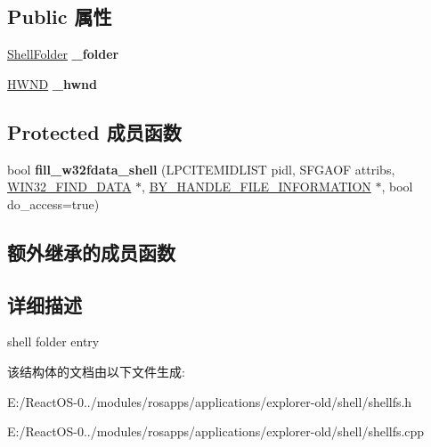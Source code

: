 \subsection*{Public 属性}
\begin{DoxyCompactItemize}
\item 
\mbox{\label{struct_shell_directory_a9a35d0d2f90518ef13601fdfb1262e30}} 
\hyperlink{struct_shell_folder}{Shell\+Folder} {\bfseries \+\_\+folder}
\item 
\mbox{\label{struct_shell_directory_ac7a5b7139055110bebf662a586e1b84f}} 
\hyperlink{interfacevoid}{H\+W\+ND} {\bfseries \+\_\+hwnd}
\end{DoxyCompactItemize}
\subsection*{Protected 成员函数}
\begin{DoxyCompactItemize}
\item 
\mbox{\label{struct_shell_directory_a9f9d1f9e7e3aae40719790c50351431e}} 
bool {\bfseries fill\+\_\+w32fdata\+\_\+shell} (L\+P\+C\+I\+T\+E\+M\+I\+D\+L\+I\+ST pidl, S\+F\+G\+A\+OF attribs, \hyperlink{struct_w_i_n32___f_i_n_d___d_a_t_a_a}{W\+I\+N32\+\_\+\+F\+I\+N\+D\+\_\+\+D\+A\+TA} $\ast$, \hyperlink{struct___b_y___h_a_n_d_l_e___f_i_l_e___i_n_f_o_r_m_a_t_i_o_n}{B\+Y\+\_\+\+H\+A\+N\+D\+L\+E\+\_\+\+F\+I\+L\+E\+\_\+\+I\+N\+F\+O\+R\+M\+A\+T\+I\+ON} $\ast$, bool do\+\_\+access=true)
\end{DoxyCompactItemize}
\subsection*{额外继承的成员函数}


\subsection{详细描述}
shell folder entry 

该结构体的文档由以下文件生成\+:\begin{DoxyCompactItemize}
\item 
E\+:/\+React\+O\+S-\/0../modules/rosapps/applications/explorer-\/old/shell/shellfs.\+h\item 
E\+:/\+React\+O\+S-\/0../modules/rosapps/applications/explorer-\/old/shell/shellfs.\+cpp\end{DoxyCompactItemize}

